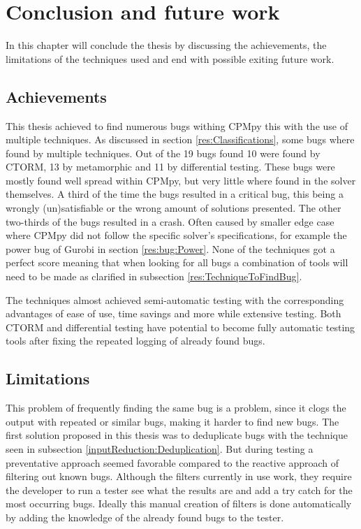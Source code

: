 \chapter{Conclusion and future work}
\label{cha:7:conclusion}
\label{con:intro}
In this chapter will conclude the thesis by discussing the achievements, the limitations of the techniques used and end with possible exiting future work.

\section{Achievements}
\label{con:Achievements}
This thesis achieved to find numerous bugs withing CPMpy this with the use of multiple techniques. As discussed in section \ref{res:Classifications}, some bugs where found by multiple techniques. Out of the 19 bugs found 10 were found by CTORM, 13 by metamorphic and 11 by differential testing. These bugs were mostly found well spread within CPMpy, but very little where found in the solver themselves. A third of the time the bugs resulted in a critical bug, this being a wrongly (un)satisfiable or the wrong amount of solutions presented. The other two-thirds of the bugs resulted in a crash. Often caused by smaller edge case where CPMpy did not follow the specific solver's specifications, for example the power bug of Gurobi in section \ref{res:bug:Power}. None of the techniques got a perfect score meaning that when looking for all bugs a combination of tools will need to be made as clarified in subsection \ref{res:TechniqueToFindBug}.

The techniques almost achieved semi-automatic testing with the corresponding advantages of ease of use, time savings and more while extensive testing. Both CTORM and differential testing have potential to become fully automatic testing tools after fixing the repeated logging of already found bugs.


\section{Limitations}
\label{con:Limitations}
This problem of frequently finding the same bug is a problem, since it clogs the output with repeated or similar bugs, making it harder to find new bugs. The first solution proposed in this thesis was to deduplicate bugs with the technique seen in subsection \ref{inputReduction:Deduplication}. But during testing a preventative approach seemed  favorable compared to the reactive approach of filtering out known bugs. Although the filters currently in use work, they require the developer to run a tester see what the results are and add a try catch for the most occurring bugs. Ideally this manual creation of filters is done automatically by adding the knowledge of the already found bugs to the tester. 

